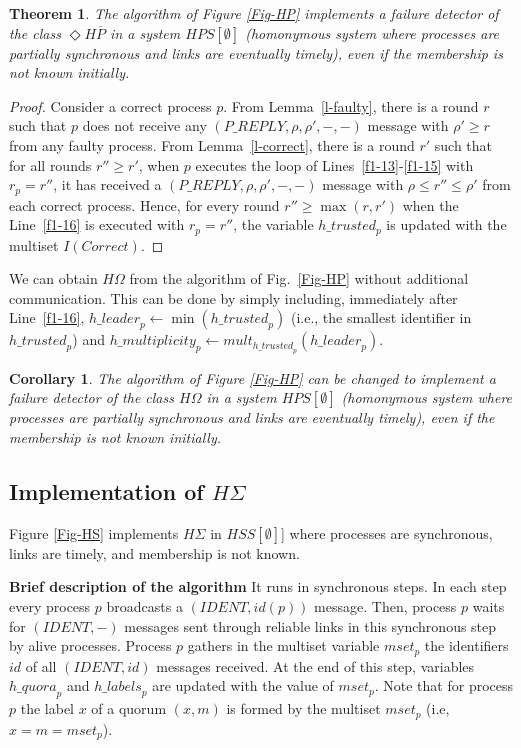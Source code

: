 \documentclass[10pt, conference, compsocconf]{IEEEtran}
\newtheorem{theorem}{Theorem}
\newtheorem{corollary}{Corollary}
\newcommand{\tightparagraph}[1]{\smallskip \noindent \textbf{#1} \hspace{1ex}}
\newcommand{\HO}{{H\Omega}}
\newcommand{\HS}{{H\Sigma}}
\newcommand{\HP}{{ \Diamond H\overline{P}}}
\newcommand{\C}{{\mathit{Correct}}}
\newcommand{\trusted}{{\mathit{h\_trusted}}}
\newcommand{\leader}{{\mathit{h\_leader}}}
\newcommand{\multiplicity}{{\mathit{h\_multiplicity}}}
\newcommand{\quora}{{\mathit{h\_quora}}}
\newcommand{\labels}{{\mathit{h\_labels}}}
\begin{document}
\begin{theorem}
The algorithm of Figure \ref{Fig-HP} implements a failure detector of 
the class ${\HP}$ in a system $\mathit{HPS}[\emptyset]$ (homonymous 
system where processes are partially synchronous and links are eventually 
timely), even if the membership is not known initially.
\end{theorem}
\begin{proof}
Consider a correct process $p$. From Lemma~\ref{l-faulty}, there is a 
round $r$ such that $p$ does not receive any 
$(\mathit{P\_REPLY}, \rho, \rho', - , -)$ message with
 $\rho' \ge r$ from any faulty process. From Lemma~\ref{l-correct}, 
there is a round $r'$ such that for all rounds $r'' \geq r'$, when 
$p$ executes the loop of Lines~\ref{f1-13}-\ref{f1-15} 
with $r_p = r''$, it has 
received a $(\mathit{P\_REPLY}, \rho, \rho', -, -)$ message with 
$\rho \le r'' \le \rho'$
from each correct process. Hence, for every round $r'' \geq \max(r,r')$ 
when the Line~\ref{f1-16} is executed with $r_p=r''$, 
the variable $h\_trusted_p$ 
is updated with the multiset $I(\C)$.
\end{proof}

We can obtain $\HO$ from the algorithm of Fig.~\ref{Fig-HP} without 
additional communication. This can be done by simply including, 
immediately after Line~\ref{f1-16}, $\leader_p \leftarrow \min(\trusted_p)$  
(i.e., the smallest identifier in $\trusted_p$) and $\multiplicity_p 
\leftarrow \mathit{mult}_{\trusted_p}(\leader_p)$.
 
\begin{corollary}
The algorithm of Figure \ref{Fig-HP} can be changed to implement a 
failure detector of the class $\HO$ in a system $\mathit{HPS}[\emptyset]$ 
(homonymous system where processes are partially synchronous and links 
are eventually timely), even if the membership is not known initially.
\end{corollary}





\subsection{Implementation of ${\HS}$}
Figure \ref{Fig-HS} implements ${\HS}$ in $HSS[\emptyset]$] 
where processes are synchronous, links are timely, and
membership is not known. 

\tightparagraph{Brief description of the algorithm} 
It runs in synchronous steps. In each step every process $p$ 
broadcasts a $(IDENT,id(p))$ message. Then, process $p$ waits for
$(IDENT,-)$ messages sent through reliable links 
in this synchronous step by alive processes. Process $p$ 
gathers in the multiset variable $mset_p$ the 
identifiers $id$ of all $(IDENT,id)$ messages received. 
At the end of this step, variables $\quora_p$ and $\labels_p$ 
are updated with the value of $mset_p$. 
Note that for process $p$ the label $x$ of a quorum $(x,m)$ is formed by the 
multiset $mset_p$ (i.e, $x=m=mset_p$).
\end{document}
